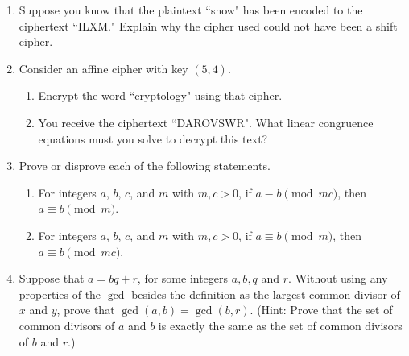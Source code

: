 \documentclass[12pt]{article}
\begin{document}
\begin{enumerate}

\item Suppose you know that the plaintext ``snow" has been encoded to the ciphertext ``ILXM." Explain why the cipher used could not have been a shift cipher.
\item Consider an affine cipher with key $(5,4)$. 
\begin{enumerate}
\item Encrypt the word ``cryptology" using that cipher. 
\item You receive the ciphertext ``DAROVSWR". What linear congruence equations must you solve to decrypt this text?
\end{enumerate}


\item Prove or disprove each of the following statements.
\begin{enumerate}
\item For integers $a$, $b$, $c$, and $m$ with $m,c>0$, if $a\equiv b\pmod{mc}$, then $a\equiv b\pmod{m}$. 
\item For integers $a$, $b$, $c$, and $m$ with $m,c>0$, if $a\equiv b\pmod{m}$, then $a\equiv b\pmod{mc}$. 
\end{enumerate} 
\item Suppose that $a=bq+r$, for some integers $a,b, q$ and $r$. Without using any properties of the $\gcd$ besides the definition as the largest common divisor of $x$ and $y$, prove that $\gcd(a,b)=\gcd(b,r)$.  (Hint: Prove that the set of common divisors of $a$ and $b$ is exactly the same as the set of common divisors of $b$ and $r$.)

\end{enumerate}
\end{document}
